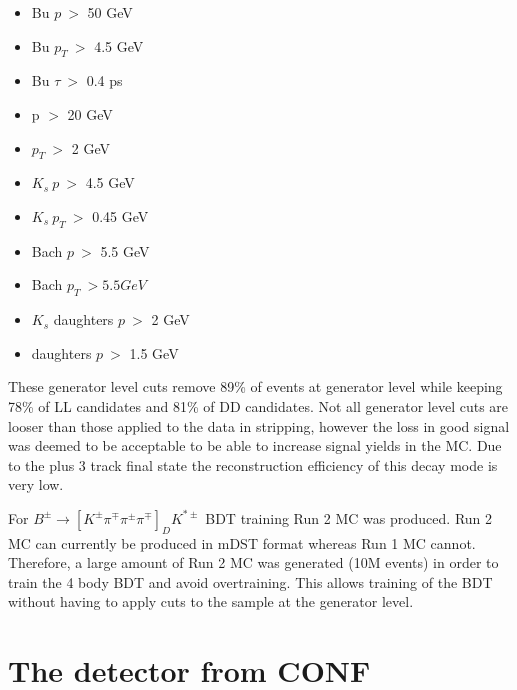 \begin{itemize}
\item{Bu $p\ >$ 50 GeV}
\item{Bu $p_T\ >$ 4.5 GeV}
\item{Bu $\tau\ >$ 0.4 ps}
\item{\Dz p $>$ 20 GeV}
\item{\Dz $p_T\ >$ 2 GeV}
\item{$K_s\ p\ >$ 4.5 GeV}
\item{$K_s\ p_T\ >$ 0.45 GeV}
\item{Bach $p\ >$ 5.5 GeV}
\item{Bach $p_T\ > 5.5 GeV$}
\item{$K_s$ daughters $p\ >$ 2 GeV}
\item{\Dz daughters $p\ >$ 1.5 GeV}
\end{itemize}

These generator level cuts remove 89\% of events at generator level while keeping 78\% of LL candidates and 81\% of DD candidates. Not all generator level cuts are looser than those applied to the data in stripping, however the loss in good signal was deemed to be acceptable to be able to increase signal yields in the MC. Due to the \KS plus 3 track final state the reconstruction efficiency of this decay mode is very low.

For $B^{\pm} \to [K^{\pm}\pi^{\mp}\pi^{\pm}\pi^{\mp}]_D K^{*\pm}$ BDT training Run 2 MC was produced. Run 2 MC can currently be produced in mDST format whereas Run 1 MC cannot. Therefore, a large amount of Run 2 MC was generated (10M events) in order to train the 4 body BDT and avoid overtraining. This allows training of the BDT without having to apply cuts to the sample at the generator level.

\section{The \lhcb detector from CONF}
\label{sec:detector}

